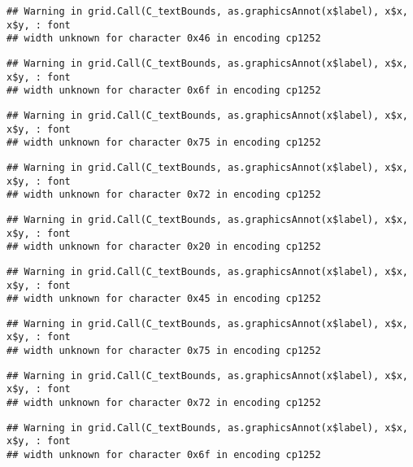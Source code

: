 \documentclass[
]{article}
\begin{document}
\begin{verbatim}
## Warning in grid.Call(C_textBounds, as.graphicsAnnot(x$label), x$x, x$y, : font
## width unknown for character 0x46 in encoding cp1252
\end{verbatim}

\begin{verbatim}
## Warning in grid.Call(C_textBounds, as.graphicsAnnot(x$label), x$x, x$y, : font
## width unknown for character 0x6f in encoding cp1252
\end{verbatim}

\begin{verbatim}
## Warning in grid.Call(C_textBounds, as.graphicsAnnot(x$label), x$x, x$y, : font
## width unknown for character 0x75 in encoding cp1252
\end{verbatim}

\begin{verbatim}
## Warning in grid.Call(C_textBounds, as.graphicsAnnot(x$label), x$x, x$y, : font
## width unknown for character 0x72 in encoding cp1252
\end{verbatim}

\begin{verbatim}
## Warning in grid.Call(C_textBounds, as.graphicsAnnot(x$label), x$x, x$y, : font
## width unknown for character 0x20 in encoding cp1252
\end{verbatim}

\begin{verbatim}
## Warning in grid.Call(C_textBounds, as.graphicsAnnot(x$label), x$x, x$y, : font
## width unknown for character 0x45 in encoding cp1252
\end{verbatim}

\begin{verbatim}
## Warning in grid.Call(C_textBounds, as.graphicsAnnot(x$label), x$x, x$y, : font
## width unknown for character 0x75 in encoding cp1252
\end{verbatim}

\begin{verbatim}
## Warning in grid.Call(C_textBounds, as.graphicsAnnot(x$label), x$x, x$y, : font
## width unknown for character 0x72 in encoding cp1252
\end{verbatim}

\begin{verbatim}
## Warning in grid.Call(C_textBounds, as.graphicsAnnot(x$label), x$x, x$y, : font
## width unknown for character 0x6f in encoding cp1252
\end{verbatim}
\end{document}
